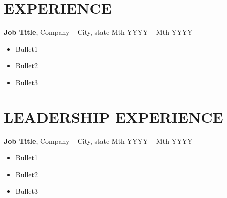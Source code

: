 \documentclass[11pt,letterpaper]{article}
\newcommand{\subheading}[3]{
    \textbf{#1}{#2 }{\hfill #3 \vspace{-2pt}}
}
\begin{document}

\section*{EXPERIENCE}
\subheading{Job Title}{, Company -- City, state}{Mth  YYYY -- Mth  YYYY \\}
\vspace{-5pt}
\begin{itemize}
  \item Bullet1
  \item Bullet2
  \item Bullet3

\end{itemize}
\vspace{-5pt}

\begin{comment}
\section{PROJECTS}
\subheading{Project Name}{, Company/Organization/School}{YYYY--YYYY}
\vspace{-5pt}
\begin{itemize}
  \item Bullet1
  \item Bullet2
  \item Bullet3
  \item Read more on \href{https://www.google.com}{Project link}
\end{itemize}
\end{comment}


\vspace{-20pt}
\section{LEADERSHIP EXPERIENCE}
\subheading{Job Title}{, Company -- City, state}{Mth  YYYY -- Mth  YYYY \\}
\vspace{-5pt}
\begin{itemize}
  \item Bullet1
  \item Bullet2
  \item Bullet3
\end{itemize}
\vspace{-10pt}
\end{document}
